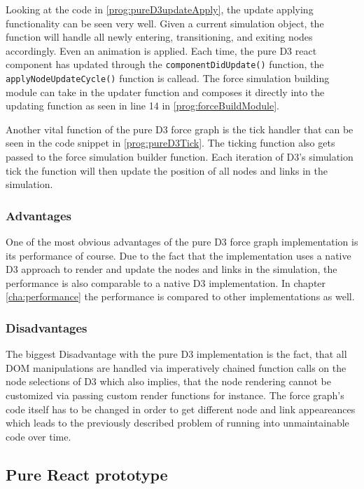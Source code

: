 Looking at the code in \ref{prog:pureD3updateApply}, the update applying functionality can be seen very well. Given a current simulation object, the function will handle all newly entering, transitioning, and exiting nodes accordingly. Even an animation is applied. Each time, the pure D3 react component has updated through the \texttt{componentDidUpdate()} function, the \texttt{applyNodeUpdateCycle()} function is callead. The force simulation building module can take in the updater function and composes it directly into the updating function as seen in line 14 in \ref{prog:forceBuildModule}.

Another vital function of the pure D3 force graph is the tick handler that can be seen in the code snippet in \ref{prog:pureD3Tick}. The ticking function also gets passed to the force simulation builder function. Each iteration of D3's simulation tick the function will then update the position of all nodes and links in the simulation.

\subsubsection{Advantages}

One of the most obvious advantages of the pure D3 force graph implementation is its performance of course. Due to the fact that the implementation uses a native D3 approach to render and update the nodes and links in the simulation, the performance is also comparable to a native D3 implementation. In chapter \ref{cha:performance} the performance is compared to other implementations as well.

\subsubsection{Disadvantages}

The biggest Disadvantage with the pure D3 implementation is the fact, that all DOM manipulations are handled via imperatively chained function calls on the node selections of D3 which also implies, that the node rendering cannot be customized via passing custom render functions for instance. The force graph's code itself has to be changed in order to get different node and link appeareances which leads to the previously described problem of running into unmaintainable code over time.

\subsection{Pure React prototype}

